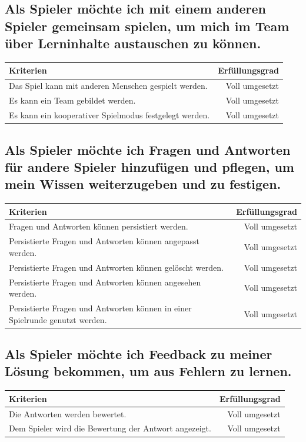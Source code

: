 \documentclass[a4paper,11pt,listof=numbered,glossary=totoc,parskip=half,toc=bib]{scrreprt}
\begin{document}
\begin{appendices}
		\subsection{Als Spieler möchte ich mit einem anderen Spieler gemeinsam spielen, um mich im Team über Lerninhalte austauschen zu können.}	
			\begin{tabularx}{\textwidth}{Xr}
			
			Kriterien & Erfüllungsgrad \\
			\midrule
		Das Spiel kann mit anderen Menschen gespielt werden. & Voll umgesetzt \\
		Es kann ein Team gebildet werden. & Voll umgesetzt \\
		Es kann ein kooperativer Spielmodus festgelegt werden. & Voll umgesetzt \\
			\bottomrule
		\end{tabularx}	
		
		\subsection{Als Spieler möchte ich Fragen und Antworten für andere Spieler hinzufügen und pflegen, um mein
Wissen weiterzugeben und zu festigen.}
		\begin{tabularx}{\textwidth}{Xr}
			
			Kriterien & Erfüllungsgrad \\
			\midrule
		Fragen und Antworten können persistiert werden. & Voll umgesetzt \\
		Persistierte Fragen und Antworten können angepasst werden. & Voll umgesetzt \\
		Persistierte Fragen und Antworten können gelöscht werden. & Voll umgesetzt \\
		Persistierte Fragen und Antworten können angesehen werden. & Voll umgesetzt \\
		Persistierte Fragen und Antworten können in einer Spielrunde genutzt werden. & Voll umgesetzt\\
			\bottomrule
		\end{tabularx}		
		
		\subsection{Als Spieler möchte ich Feedback zu meiner Lösung bekommen, um aus Fehlern zu lernen.}
		\begin{tabularx}{\textwidth}{Xr}
			
			Kriterien & Erfüllungsgrad \\
			\midrule
			Die Antworten werden bewertet. & Voll umgesetzt \\
			Dem Spieler wird die Bewertung der Antwort angezeigt. & Voll umgesetzt \\
			

\end{tabularx}
\end{appendices}
\end{document}
